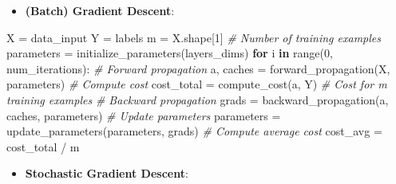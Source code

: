 \documentclass[11pt]{article}
\providecommand{\tightlist}{%
      \setlength{\itemsep}{0pt}\setlength{\parskip}{0pt}}
\newenvironment{Shaded}{}{}
\newcommand{\KeywordTok}[1]{\textcolor[rgb]{0.00,0.44,0.13}{\textbf{{#1}}}}
\newcommand{\DecValTok}[1]{\textcolor[rgb]{0.25,0.63,0.44}{{#1}}}
\newcommand{\CommentTok}[1]{\textcolor[rgb]{0.38,0.63,0.69}{\textit{{#1}}}}
\newcommand{\NormalTok}[1]{{#1}}
\newcommand{\ControlFlowTok}[1]{\textcolor[rgb]{0.00,0.44,0.13}{\textbf{{#1}}}}
\newcommand{\OperatorTok}[1]{\textcolor[rgb]{0.40,0.40,0.40}{{#1}}}
\newcommand{\BuiltInTok}[1]{{#1}}
\begin{document}
\begin{itemize}
\tightlist
\item
  \textbf{(Batch) Gradient Descent}:
\end{itemize}

\begin{Shaded}
\begin{Highlighting}[]
\NormalTok{X }\OperatorTok{=}\NormalTok{ data\_input}
\NormalTok{Y }\OperatorTok{=}\NormalTok{ labels}
\NormalTok{m }\OperatorTok{=}\NormalTok{ X.shape[}\DecValTok{1}\NormalTok{]  }\CommentTok{\# Number of training examples}
\NormalTok{parameters }\OperatorTok{=}\NormalTok{ initialize\_parameters(layers\_dims)}
\ControlFlowTok{for}\NormalTok{ i }\KeywordTok{in} \BuiltInTok{range}\NormalTok{(}\DecValTok{0}\NormalTok{, num\_iterations):}
    \CommentTok{\# Forward propagation}
\NormalTok{    a, caches }\OperatorTok{=}\NormalTok{ forward\_propagation(X, parameters)}
    \CommentTok{\# Compute cost}
\NormalTok{    cost\_total }\OperatorTok{=}\NormalTok{ compute\_cost(a, Y)  }\CommentTok{\# Cost for m training examples}
    \CommentTok{\# Backward propagation}
\NormalTok{    grads }\OperatorTok{=}\NormalTok{ backward\_propagation(a, caches, parameters)}
    \CommentTok{\# Update parameters}
\NormalTok{    parameters }\OperatorTok{=}\NormalTok{ update\_parameters(parameters, grads)}
    \CommentTok{\# Compute average cost}
\NormalTok{    cost\_avg }\OperatorTok{=}\NormalTok{ cost\_total }\OperatorTok{/}\NormalTok{ m}
        
\end{Highlighting}
\end{Shaded}

\begin{itemize}
\tightlist
\item
  \textbf{Stochastic Gradient Descent}:
\end{itemize}
\end{document}
